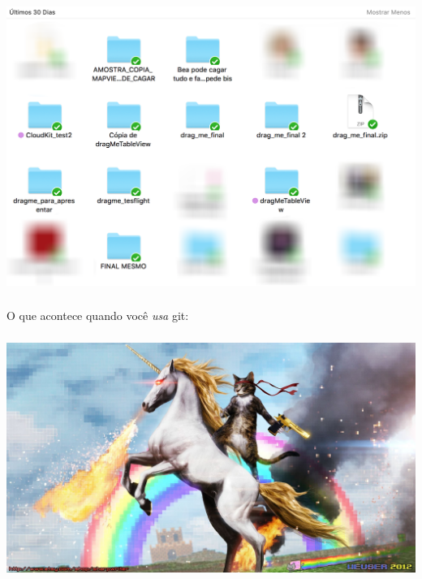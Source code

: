 \documentclass[aspectratio=169]{beamer}
\makeatletter
\newcommand*{\currentname}{\@currentlabelname}
\makeatother
\begin{document}
\begin{frame}
  \frametitle{\currentname}
  \begin{center}
    \includegraphics[height=0.8\textheight]{img/sem-git.png}
  \end{center}
\end{frame}

\begin{frame}
  \frametitle{\currentname}
  \begin{center}
    {\Huge O que acontece quando você \textit{usa} git:}
  \end{center}
\end{frame}

\begin{frame}
  \frametitle{\currentname}
  \begin{center}
    \includegraphics[height=0.8\textheight]{img/com-git.jpg}
  \end{center}
\end{frame}
\end{document}
